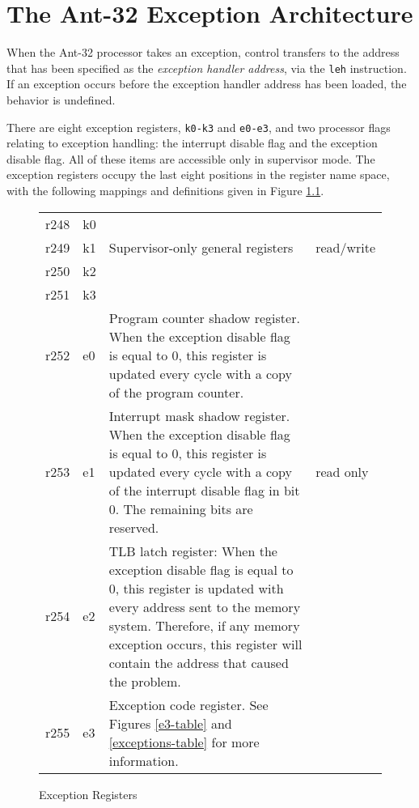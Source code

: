 
\chapter{The Ant-32 Exception Architecture}
\label{ExceptionArchitecture}

When the Ant-32 processor takes an exception, control transfers to the
address that has been specified as the {\em exception handler
address}, via the {\tt leh} instruction.  If an exception occurs
before the exception handler address has been loaded, the behavior is
undefined.

There are eight exception registers, {\tt k0-k3} and {\tt e0-e3}, and two
processor flags relating to exception handling: the interrupt disable
flag and the exception disable flag. All of these items are accessible
only in supervisor mode.  The exception registers occupy the last eight
positions in the register name space, with the following mappings 
and definitions given in Figure \ref{exc-registers}.

\begin{figure}[ht]
\begin{center}
\caption{\label{exc-registers} Exception Registers}

\begin{tabular}{|l |l |p{} |l|}
\hline

r248	& k0	&		&\\
\cline{1-2}

r249	& k1 	& Supervisor-only general registers	& read/write\\
\cline{1-2}

r250	& k2 	&		&\\
\cline{1-2}

r251	& k3 	&		&\\
\hline

r252	& e0 	& Program counter shadow register.  
When the exception disable flag is equal to 0, this register is updated 
every cycle with a copy of the program counter.		&\\
\cline{1-3}

r253	& e1 	& Interrupt mask shadow register.
When the exception disable flag is equal to 0, this register is updated 
every cycle with a copy of the interrupt disable flag in bit 0.
The remaining bits are reserved. 		&read only\\
\cline{1-3}

r254	& e2 	& TLB latch register: When the exception disable
flag is equal to 0, this register is updated with every address sent
to the memory system.  Therefore, if any memory exception occurs,
this register will contain the address that caused the problem.  &\\
\cline{1-3}

r255	& e3	& Exception code register.  See Figures \ref{e3-table}
			and \ref{exceptions-table} for more information. &\\
\hline
\end{tabular} \linebreak
\end{center}
\end{figure}

